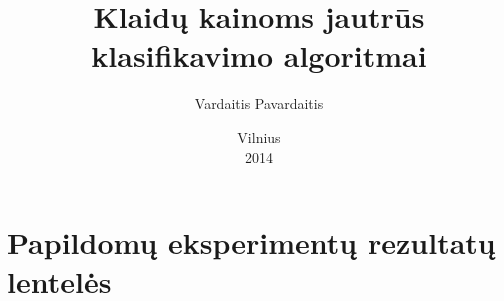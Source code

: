 \documentclass[12pt, a4paper, lithuanian]{article}
\title{Klaidų kainoms jautrūs klasifikavimo algoritmai}
\author{
   Vardaitis Pavardaitis 
}
\date{Vilnius \\ 2014}
\begin{document}
\sloppy
\maketitle





\tableofcontents



















\appendix
\section{Papildomų eksperimentų rezultatų lentelės}


\end{document}
